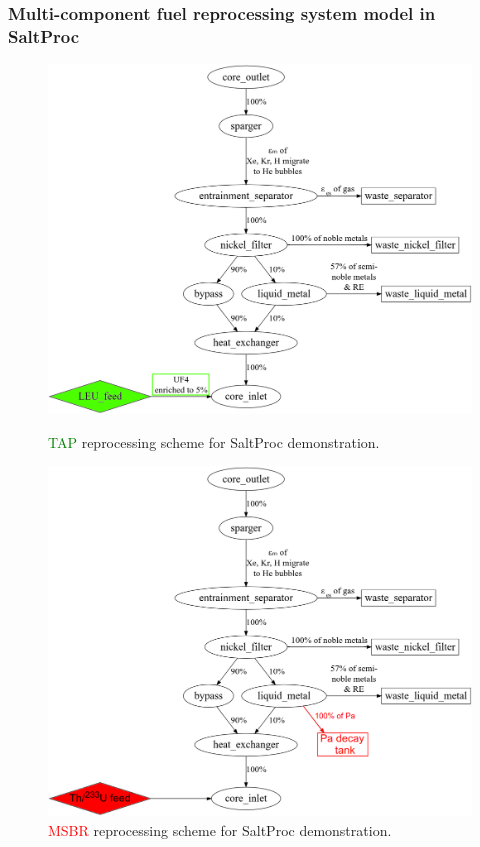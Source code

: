 \begin{frame}
\frametitle{Multi-component fuel reprocessing system model in SaltProc}       

\begin{figure}[htp!] %
	\centering
	\vspace{-2mm}
	\begin{overprint}
	\includegraphics[height=0.85\textheight]{./images/tap_saltproc_var_eps.png}
		\vspace{-2mm}
    \caption{\textcolor{green}{\gls{TAP}} reprocessing scheme for 
	SaltProc demonstration.}
	\includegraphics[height=0.85\textheight]{./images/msbr_saltproc_var_eps.png}
		\vspace{-2mm}
	\caption{\textcolor{red}{\gls{MSBR}} reprocessing scheme for 
	SaltProc demonstration.}
	\end{overprint}
\end{figure}

\end{frame}


